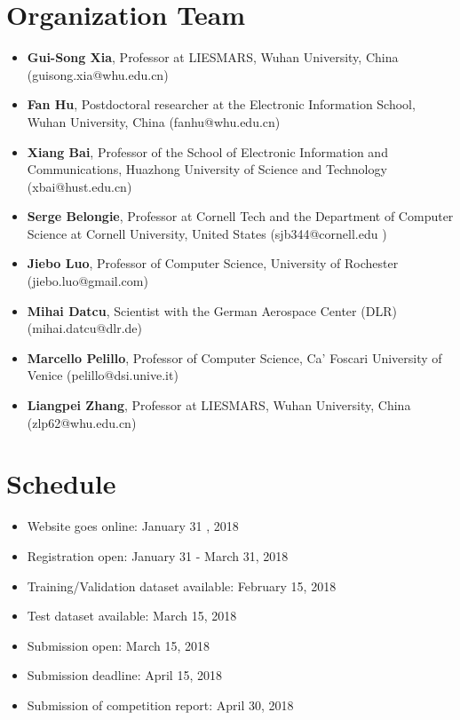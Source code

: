 \documentclass[a4paper]{article}
\begin{document}
\section{Organization Team}
\begin{itemize}
\item \textbf{Gui-Song Xia}, Professor at LIESMARS, Wuhan University, China (guisong.xia@whu.edu.cn)
\item \textbf{Fan Hu}, Postdoctoral researcher at the Electronic Information School, Wuhan University, China (fanhu@whu.edu.cn)
\item \textbf{Xiang Bai}, Professor of the School of Electronic Information and Communications, Huazhong University of Science and Technology (xbai@hust.edu.cn)
\item \textbf{Serge Belongie}, Professor at Cornell Tech and the Department of Computer Science at Cornell University, United States (sjb344@cornell.edu )
\item \textbf{Jiebo Luo}, Professor of Computer Science, University of Rochester (jiebo.luo@gmail.com)
\item \textbf{Mihai Datcu}, Scientist with the German
Aerospace Center (DLR) (mihai.datcu@dlr.de)
\item \textbf{Marcello Pelillo}, Professor of Computer Science, Ca' Foscari University of Venice (pelillo@dsi.unive.it)
\item \textbf{Liangpei Zhang}, Professor at LIESMARS, Wuhan University, China (zlp62@whu.edu.cn)
\end{itemize}


\section{Schedule}
\begin{itemize}
	\item Website goes online:												January 31 , 2018
	\item Registration open:													   January 31 - March 31, 2018
	\item Training/Validation dataset available:				February 15, 2018
	\item Test dataset available:											March 15, 2018
	\item Submission open:													  March 15, 2018
	\item Submission deadline:											  April 15, 2018
	\item Submission of competition report:					April 30, 2018
\end{itemize}
\end{document}
